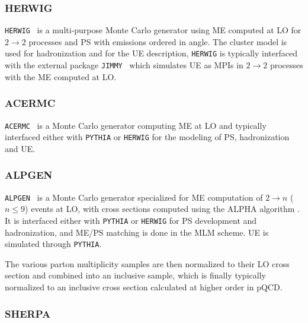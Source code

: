 \subsubsection*{HERWIG}

\texttt{HERWIG}~\cite{HERWIG} is a multi-purpose Monte Carlo generator
using ME computed at LO for $2 \to 2$ processes and PS with emissions ordered in angle. 
The cluster model is used for hadronization and for the UE description, \texttt{HERWIG}
is typically interfaced with the external package \texttt{JIMMY}~\cite{jimmy} which
simulates UE as MPIs in  $2 \to 2$ processes with the ME computed at LO.


\subsubsection*{ACERMC}

\texttt{ACERMC}~\cite{acermc} is a Monte Carlo generator computing
ME at LO and typically interfaced either with \texttt{PYTHIA} or 
\texttt{HERWIG} for the modeling of PS, hadronization and UE.


\subsubsection*{ALPGEN}

\texttt{ALPGEN}~\cite{ALPGEN} is a Monte Carlo generator specialized for
ME computation of $2 \to n$ ($n\leq 9$) events at LO, with cross sections 
computed using the ALPHA algorithm \cite{ALPGEN_0}. It is interfaced either
with \texttt{PYTHIA} or \texttt{HERWIG} for PS development 
and hadronization, and ME/PS matching
is done in the MLM scheme. %
UE is simulated through \texttt{PYTHIA}. 

The various parton multiplicity samples are then normalized to their LO cross section
and combined into an inclusive sample, which is finally typically normalized 
to an inclusive cross section calculated at higher order in pQCD. 


\subsubsection*{SHERPA}


